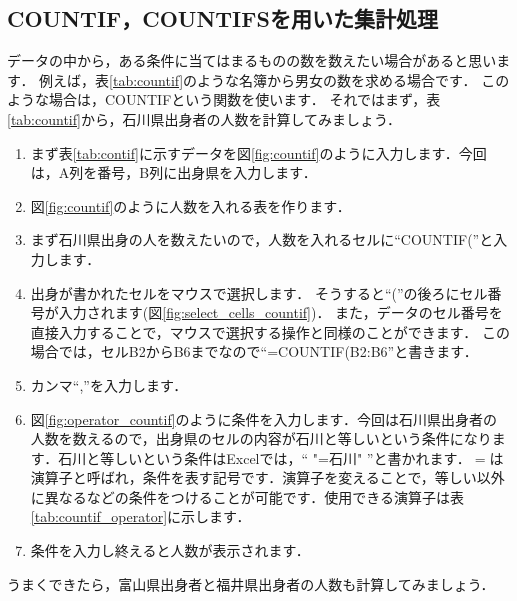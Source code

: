 \subsection{COUNTIF，COUNTIFSを用いた集計処理}

データの中から，ある条件に当てはまるものの数を数えたい場合があると思います．
例えば，表\ref{tab:countif}のような名簿から男女の数を求める場合です．
このような場合は，COUNTIFという関数を使います．
それではまず，表\ref{tab:countif}から，石川県出身者の人数を計算してみましょう．
\begin{enumerate}
    \item まず表\ref{tab:contif}に示すデータを図\ref{fig:countif}のように入力します．今回は，A列を番号，B列に出身県を入力します．
    \item 図\ref{fig:countif}のように人数を入れる表を作ります．
    \item まず石川県出身の人を数えたいので，人数を入れるセルに``COUNTIF(''と入力します．
    \item 出身が書かれたセルをマウスで選択します．
    そうすると``(''の後ろにセル番号が入力されます(図\ref{fig:select_cells_countif})．
    また，データのセル番号を直接入力することで，マウスで選択する操作と同様のことができます．
    この場合では，セルB2からB6までなので``=COUNTIF(B2:B6''と書きます．
    \item カンマ``,''を入力します．
    \item 図\ref{fig:operator_countif}のように条件を入力します．今回は石川県出身者の人数を数えるので，出身県のセルの内容が石川と等しいという条件になります．石川と等しいという条件はExcelでは，`` "=石川" ''と書かれます．$=$は演算子と呼ばれ，条件を表す記号です．演算子を変えることで，等しい以外に異なるなどの条件をつけることが可能です．使用できる演算子は表\ref{tab:countif_operator}に示します．
    \item 条件を入力し終えると人数が表示されます．
\end{enumerate}
うまくできたら，富山県出身者と福井県出身者の人数も計算してみましょう．

